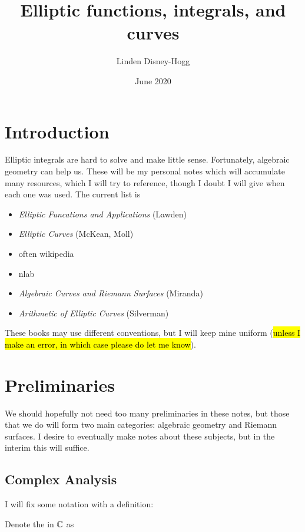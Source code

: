 \documentclass{article}
\title{Elliptic functions, integrals, and curves}
\author{Linden Disney-Hogg}
\date{June 2020}
\begin{document}
\maketitle
\tableofcontents

\section{Introduction}
Elliptic integrals are hard to solve and make little sense. Fortunately, algebraic geometry can help us. These will be my personal notes which will accumulate many resources, which I will try to reference, though I doubt I will give when each one was used. The current list is 
\begin{itemize}
	\item \textit{Elliptic Funcations and Applications} (Lawden)
	\item \textit{Elliptic Curves} (McKean, Moll) 
	\item often wikipedia
	\item nlab
	\item \textit{Algebraic Curves and Riemann Surfaces} (Miranda)
	\item \textit{Arithmetic of Elliptic Curves} (Silverman)
\end{itemize}
These books may use different conventions, but I will keep mine uniform (\hl{unless I make an error, in which case please do let me know}). 

\section{Preliminaries}
We should hopefully not need too many preliminaries in these notes, but those that we do will form two main categories: algebraic geometry and Riemann surfaces. I desire to eventually make notes about these subjects, but in the interim this will suffice. 

\subsection{Complex Analysis}

I will fix some notation with a definition:

\begin{definition}
	Denote the  in $\mathbb{C}$ as 
\end{definition}
\end{document}
